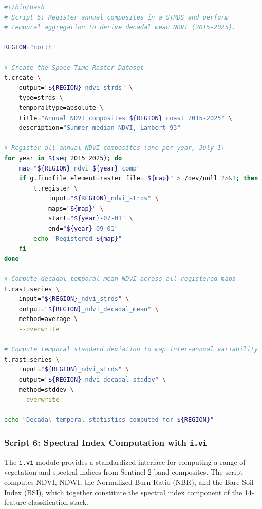 \documentclass[remotesensing,article,submit,pdftex,moreauthors]{Definitions/mdpi}
\begin{document}
\begin{lstlisting}[language=bash, caption={Space-Time Raster Dataset creation and temporal aggregation using \texttt{t.rast.series}.}, label={lst:trast}]
#!/bin/bash
# Script 5: Register annual composites in a STRDS and perform
# temporal aggregation to derive decadal mean NDVI (2015-2025).

REGION="north"

# Create the Space-Time Raster Dataset
t.create \
    output="${REGION}_ndvi_strds" \
    type=strds \
    temporaltype=absolute \
    title="Annual NDVI composites ${REGION} coast 2015-2025" \
    description="Summer median NDVI, Lambert-93"

# Register all annual NDVI composites (one per year, July 1)
for year in $(seq 2015 2025); do
    map="${REGION}_ndvi_${year}_comp"
    if g.findfile element=raster file="${map}" > /dev/null 2>&1; then
        t.register \
            input="${REGION}_ndvi_strds" \
            maps="${map}" \
            start="${year}-07-01" \
            end="${year}-09-01"
        echo "Registered ${map}"
    fi
done

# Compute decadal temporal mean NDVI across all registered maps
t.rast.series \
    input="${REGION}_ndvi_strds" \
    output="${REGION}_ndvi_decadal_mean" \
    method=average \
    --overwrite

# Compute temporal standard deviation to map inter-annual variability
t.rast.series \
    input="${REGION}_ndvi_strds" \
    output="${REGION}_ndvi_decadal_stddev" \
    method=stddev \
    --overwrite

echo "Decadal temporal statistics computed for ${REGION}"
\end{lstlisting}

\subsubsection*{Script 6: Spectral Index Computation with \texttt{i.vi}}

The \texttt{i.vi} module provides a standardized interface for computing a range of vegetation and spectral indices from Sentinel-2 band composites. The script computes NDVI, NDWI, the Normalized Burn Ratio (NBR), and the Bare Soil Index (BSI), which together constitute the spectral index component of the 14-feature classification stack.
\end{document}
